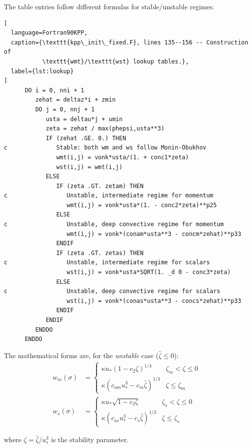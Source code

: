 \documentclass[12pt,letterpaper]{article}
\newcommand{\ustar}{u_*}
\begin{document}
The table entries follow different formulas for stable/unstable regimes:  
  
\begin{lstlisting}[  
  language=Fortran90KPP,  
  caption={\texttt{kpp\_init\_fixed.F}, lines 135--156 -- Construction of
           \texttt{wmt}/\texttt{wst} lookup tables.},  
  label={lst:lookup}  
]  
      DO i = 0, nni + 1  
         zehat = deltaz*i + zmin  
         DO j = 0, nnj + 1  
            usta = deltau*j + umin  
            zeta = zehat / max(phepsi,usta**3)  
            IF (zehat .GE. 0.) THEN  
c              Stable: both wm and ws follow Monin-Obukhov  
               wmt(i,j) = vonk*usta/(1. + conc1*zeta)  
               wst(i,j) = wmt(i,j)  
            ELSE  
               IF (zeta .GT. zetam) THEN  
c                 Unstable, intermediate regime for momentum  
                  wmt(i,j) = vonk*usta*(1. - conc2*zeta)**p25  
               ELSE  
c                 Unstable, deep convective regime for momentum  
                  wmt(i,j) = vonk*(conam*usta**3 - concm*zehat)**p33  
               ENDIF  
               IF (zeta .GT. zetas) THEN  
c                 Unstable, intermediate regime for scalars  
                  wst(i,j) = vonk*usta*SQRT(1. _d 0 - conc3*zeta)  
               ELSE  
c                 Unstable, deep convective regime for scalars  
                  wst(i,j) = vonk*(conas*usta**3 - concs*zehat)**p33  
               ENDIF  
            ENDIF  
         ENDDO  
      ENDDO  
\end{lstlisting}  
  
The mathematical forms are, for the \textit{unstable} case  
($\hat{\zeta} \leq 0$):  
\begin{align}  
w_m(\sigma) &=  
\begin{cases}  
\kappa \ustar (1 - c_2 \zeta)^{1/4}  
  & \zeta_m < \zeta \leq 0 \\[4pt]  
\kappa (c_{am} \ustar^3 - c_m \hat{\zeta})^{1/3}  
  & \zeta \leq \zeta_m  
\end{cases} \\[6pt]  
w_s(\sigma) &=  
\begin{cases}  
\kappa \ustar \sqrt{1 - c_3 \zeta}  
  & \zeta_s < \zeta \leq 0 \\[4pt]  
\kappa (c_{as} \ustar^3 - c_s \hat{\zeta})^{1/3}  
  & \zeta \leq \zeta_s  
\end{cases}  
\end{align}  
  
where $\zeta = \hat{\zeta}/\ustar^3$ is the stability parameter.  
  
\end{document}
